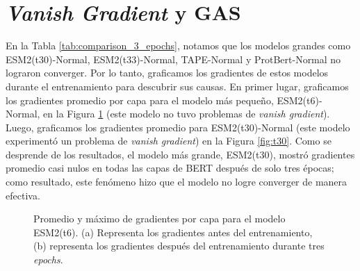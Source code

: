 \section{\textit{Vanish Gradient} y GAS}

En la Tabla \ref{tab:comparison_3_epochs}, notamos que los modelos grandes como ESM2(t30)-Normal, ESM2(t33)-Normal, TAPE-Normal y ProtBert-Normal no lograron converger. Por lo tanto, graficamos los gradientes de estos modelos durante el entrenamiento para descubrir sus causas. En primer lugar, graficamos los gradientes promedio por capa para el modelo más pequeño, ESM2(t6)-Normal, en la Figura \ref{fig:t6} (este modelo no tuvo problemas de \textit{vanish gradient}). Luego, graficamos los gradientes promedio para ESM2(t30)-Normal (este modelo experimentó un problema de \textit{vanish gradient}) en la Figura \ref{fig:t30}. Como se desprende de los resultados, el modelo más grande, ESM2(t30), mostró gradientes promedio casi nulos en todas las capas de BERT después de solo tres épocas; como resultado, este fenómeno hizo que el modelo no logre converger de manera efectiva.

\begin{figure}[H]
	\centering
	

	\caption[Gradientes del modelo ESM2(t6)]{Promedio y máximo de gradientes por capa para el modelo ESM2(t6). (a) Representa los gradientes antes del entrenamiento, (b) representa los gradientes después del entrenamiento durante tres \textit{epochs}.}
	\label{fig:t6}
\end{figure}

